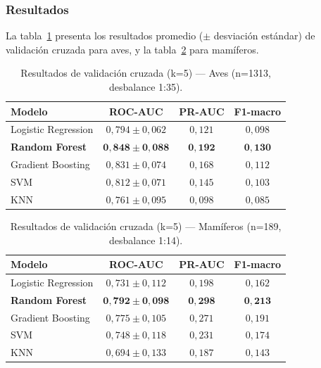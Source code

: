 \documentclass[12pt,a4paper]{article}
\begin{document}
\subsubsection{Resultados}

La tabla~\ref{tab:resultados_aves} presenta los resultados promedio ($\pm$ desviación estándar)
de validación cruzada para aves, y la tabla~\ref{tab:resultados_mam} para mamíferos.

\begin{table}[H]
  \centering
  \caption{Resultados de validación cruzada (k=5) --- Aves (n=1313, desbalance 1:35).}
  \label{tab:resultados_aves}
  \begin{tabular}{lccc}
    \toprule
    \textbf{Modelo} & \textbf{ROC-AUC} & \textbf{PR-AUC} & \textbf{F1-macro} \\
    \midrule
    Logistic Regression  & $0{,}794 \pm 0{,}062$ & $0{,}121$ & $0{,}098$ \\
    \textbf{Random Forest}       & $\mathbf{0{,}848 \pm 0{,}088}$ & $\mathbf{0{,}192}$ & $\mathbf{0{,}130}$ \\
    Gradient Boosting    & $0{,}831 \pm 0{,}074$ & $0{,}168$ & $0{,}112$ \\
    SVM                  & $0{,}812 \pm 0{,}071$ & $0{,}145$ & $0{,}103$ \\
    KNN                  & $0{,}761 \pm 0{,}095$ & $0{,}098$ & $0{,}085$ \\
    \bottomrule
  \end{tabular}
\end{table}

\begin{table}[H]
  \centering
  \caption{Resultados de validación cruzada (k=5) --- Mamíferos (n=189, desbalance 1:14).}
  \label{tab:resultados_mam}
  \begin{tabular}{lccc}
    \toprule
    \textbf{Modelo} & \textbf{ROC-AUC} & \textbf{PR-AUC} & \textbf{F1-macro} \\
    \midrule
    Logistic Regression  & $0{,}731 \pm 0{,}112$ & $0{,}198$ & $0{,}162$ \\
    \textbf{Random Forest}       & $\mathbf{0{,}792 \pm 0{,}098}$ & $\mathbf{0{,}298}$ & $\mathbf{0{,}213}$ \\
    Gradient Boosting    & $0{,}775 \pm 0{,}105$ & $0{,}271$ & $0{,}191$ \\
    SVM                  & $0{,}748 \pm 0{,}118$ & $0{,}231$ & $0{,}174$ \\
    KNN                  & $0{,}694 \pm 0{,}133$ & $0{,}187$ & $0{,}143$ \\
    \bottomrule
  \end{tabular}
\end{table}
\end{document}
